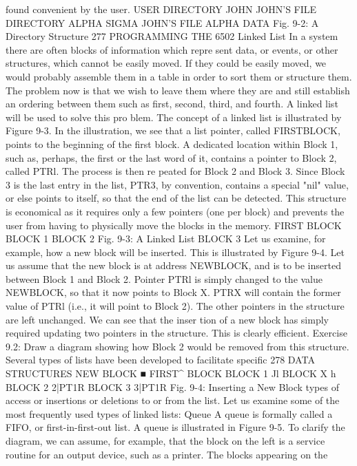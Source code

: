 \documentclass{book}
\begin{document}
{found convenient by the user.
USER DIRECTORY
JOHN
JOHN'S
FILE DIRECTORY
ALPHA
SIGMA
JOHN'S FILE
ALPHA
DATA
Fig. 9-2: A Directory Structure
277
PROGRAMMING THE 6502
Linked List
In a system there are often blocks of information which repre
sent data, or events, or other structures, which cannot be easily
moved. If they could be easily moved, we would probably assemble
them in a table in order to sort them or structure them. The
problem now is that we wish to leave them where they are and
still establish an ordering between them such as first, second,
third, and fourth. A linked list will be used to solve this pro
blem. The concept of a linked list is illustrated by Figure 9-3. In
the illustration, we see that a list pointer, called FIRSTBLOCK,
points to the beginning of the first block. A dedicated location
within Block 1, such as, perhaps, the first or the last word of it,
contains a pointer to Block 2, called PTRl. The process is then re
peated for Block 2 and Block 3. Since Block 3 is the last entry in
the list, PTR3, by convention, contains a special "nil" value, or
else points to itself, so that the end of the list can be detected. This
structure is economical as it requires only a few pointers (one per
block) and prevents the user from having to physically move the
blocks in the memory.
FIRST
BLOCK
BLOCK 1 BLOCK 2
Fig. 9-3: A Linked List
BLOCK 3
Let us examine, for example, how a new block will be inserted.
This is illustrated by Figure 9-4. Let us assume that the new block
is at address NEWBLOCK, and is to be inserted between Block 1
and Block 2. Pointer PTRl is simply changed to the value NEWBLOCK,
so that it now points to Block X. PTRX will contain the
former value of PTRl (i.e., it will point to Block 2). The other
pointers in the structure are left unchanged. We can see that the inser
tion of a new block has simply required updating two pointers in
the structure. This is clearly efficient.
Exercise 9.2: Draw a diagram showing how Block 2 would be
removed from this structure.
Several types of lists have been developed to facilitate specific
278
DATA STRUCTURES
NEW BLOCK ■
FIRST^
BLOCK
BLOCK 1 Jl
BLOCK X h
BLOCK 2 2|PT1R BLOCK 3 3|PT1R Fig. 9-4: Inserting a New Block
types of access or insertions or deletions to or from the list. Let us
examine some of the most frequently used types of linked lists:
Queue
A queue is formally called a FIFO, or first-in-first-out list. A
queue is illustrated in Figure 9-5. To clarify the diagram, we can
assume, for example, that the block on the left is a service routine
for an output device, such as a printer. The blocks appearing on the
}
\end{document}
